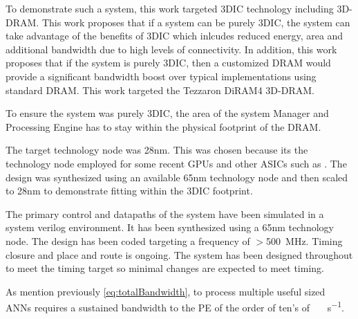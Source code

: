 \documentclass[journal]{IEEEtran}
\begin{document}
To demonstrate such a system, this work targeted 3DIC technology including 3D-DRAM. This work proposes that if a system can be purely 3DIC, the system can take advantage of the benefits
of 3DIC which inlcudes reduced energy, area and additional bandwidth due to high levels of connectivity.
In addition, this work proposes that if the system is purely 3DIC, then a customized DRAM would provide a significant bandwidth boost over typical implementations using standard DRAM.
This work targeted the Tezzaron DiRAM4 3D-DRAM.

To ensure the system was purely 3DIC, the area of the system Manager and Processing Engine has to stay within the physical footprint of the DRAM.

The target technology node was 28nm. This was chosen because its the technology node employed for some recent GPUs and other ASICs such as \cite{jouppi2017datacenter}.
The design was synthesized using an available 65nm technology node and then scaled to 28nm to demonstrate fitting within the 3DIC footprint.

The primary control and datapaths of the system have been simulated in a system verilog environment. It has been synthesized using a 65nm technology node.
The design has been coded targeting a frequency of $>$\SI{500}{\mega\hertz}. Timing closure and place and route is ongoing. The system has been designed throughout to meet the timing target so minimal changes are expected to meet timing.

As mention previously \eqref{eq:totalBandwidth}, to process multiple useful sized ANNs requires a sustained bandwidth to the PE of the order of ten's of \SI[per-mode=symbol]{}{\tera\bit\per\second}.
\end{document}
